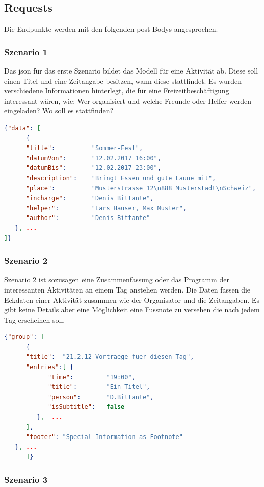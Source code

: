 \documentclass[main.tex]{subfiles}
\begin{document}
\subsection{Requests}
Die Endpunkte werden mit den folgenden \gls{post}-Bodys angesprochen. 


\subsubsection{Szenario 1}
Das \acrlong{json} für das erste Szenario bildet das Modell für eine Aktivität ab. Diese soll einen Titel und eine Zeitangabe besitzen, wann diese stattfindet. Es wurden verschiedene Informationen hinterlegt, die für eine Freizeitbeschäftigung interessant wären, wie: Wer organisiert und welche Freunde oder Helfer werden eingeladen? Wo soll es stattfinden?  
\begin{lstlisting}[language=json]
{"data": [
      {
      "title":          "Sommer-Fest",
      "datumVon":       "12.02.2017 16:00",
      "datumBis":       "12.02.2017 23:00",
      "description":    "Bringt Essen und gute Laune mit",
      "place":          "Musterstrasse 12\n888 Musterstadt\nSchweiz",
      "incharge":       "Denis Bittante",
      "helper":         "Lars Hauser, Max Muster",
      "author":         "Denis Bittante"
   }, ...
]}


\end{lstlisting}


\subsubsection{Szenario 2}
Szenario 2 ist sozusagen eine Zusammenfassung oder das Programm der interessanten Aktivitäten an einem Tag anstehen werden. Die Daten fassen die Eckdaten einer Aktivität zusammen wie der Organisator und die Zeitangaben. Es gibt keine Details aber eine Möglichkeit eine Fussnote zu versehen die nach jedem Tag erscheinen soll. 
\begin{lstlisting}[language=json]
{"group": [
      {
      "title":  "21.2.12 Vortraege fuer diesen Tag",
      "entries":[ {
            "time":         "19:00",
            "title":        "Ein Titel",
            "person":       "D.Bittante",
            "isSubtitle":   false
         },  ...
      ],
      "footer": "Special Information as Footnote"
   }, ...
      ]}


\end{lstlisting}


\subsubsection{Szenario 3}
\end{document}

